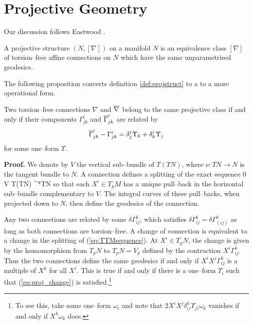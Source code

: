 \section{Projective Geometry}\label{sec:projgeom}

Our discussion follows Eastwood \cite{Eastwood}.

\begin{defi}\label{def:projstruct} A projective structure $(N,[\nabla])$
on a manifold $N$ is an equivalence class $[\nabla]$ of torsion--free affine connections on $N$ which have the same unparametrised geodesics.
\end{defi}

The following proposition converts definition \ref{def:projstruct} to a to a more operational form.

\begin{prop} Two torsion--free connections $\nabla$ and $\overline{\nabla}$ belong to the same projective class if and only if their components $\Gamma^i_{jk}$ and $\overline{\Gamma}^i_{jk}$ are related by
\begin{equation}
\overline{\Gamma}^i_{jk} - \Gamma^i_{jk} = \delta_{j}^{i}\Upsilon_{k}+\delta_{k}^{i}\Upsilon_{j}\label{eq:proj_change}
\end{equation}
for some one--form $\Upsilon.$
\end{prop}

{\bf Proof.} We denote by $V$ the vertical sub--bundle of $T(TN)$, where $\nu:TN\rightarrow N$ is the tangent bundle to $N$. A connection defines a splitting of the exact sequence
\be \label{eq:TTMsequence}
0 \longrightarrow V \longrightarrow T(TN) \longrightarrow \nu^*TN 
\ee
so that each $X^i\in T_pM$ has a unique pull--back in the horizontal sub--bundle complementary to $V$. The integral curves of these pull--backs, when projected down to $N$, then define the geodesics of the connection.

Any two connections are related by some $\delta\Gamma^k_{ij}$, which satisfies $\delta\Gamma^k_{ij}=\delta\Gamma^k_{(ij)}$ as long as both connections are torsion--free. A change of connection is equivalent to a change in the splitting of (\ref{eq:TTMsequence}). At $X^i\in T_pN$, the change is given by the homomorphism from $T_pN$ to $T_pN=V_p$ defined by the contraction $X^i\Gamma^k_{ij}$. Thus the two connections define the same geodesics if and only if $X^iX^j\Gamma^k_{ij}$ is a multiple of $X^k$ for all $X^i$. This is true if and only if there is a one--form $\Upsilon_i$ such that (\ref{eq:proj_change}) is satisfied.\footnote{To see this, take some one--form $\omega_i$ and note that $2X^iX^j\delta^k_{(i}\Upsilon_{j)}\omega_k$ vanishes if and only if $X^k\omega_k$ does.}
\koniec

